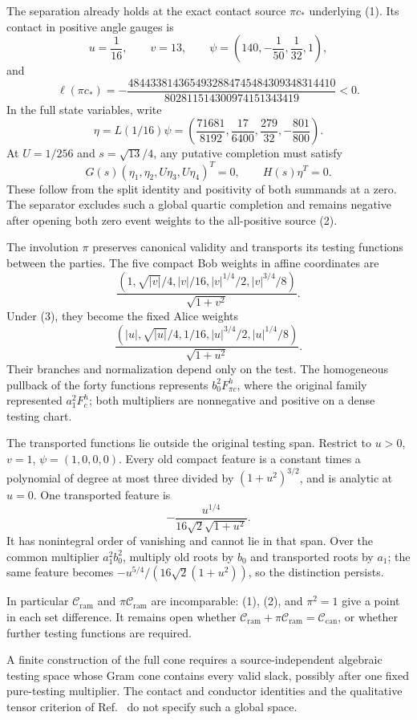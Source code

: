 \documentclass[10pt]{article}
\newcommand{\Cr}{\mathcal C_{\mathrm{ram}}}
\newcommand{\Cc}{\mathcal C_{\mathrm{can}}}
\begin{document}
The separation already holds at the exact contact source $\pi c_*$
underlying (1). Its contact in positive angle gauges is
\[
 u=\frac1{16},\qquad v=13,\qquad
 \psi=\left(140,-\frac1{50},\frac1{32},1\right),
\]
and
\[
 \ell(\pi c_*)=
 -\frac{4844338143654932884745484309348314410}
        {802811514300974151343419}<0.                    \tag{12}
\]
In the full state variables, write
\[
 \eta=L(1/16)\psi=
 \left(\frac{71681}{8192},\frac{17}{6400},
       \frac{279}{32},-\frac{801}{800}\right).
\]
At $U=1/256$ and $s=\sqrt{13}/4$, any putative completion must satisfy
\[
 G(s)(\eta_1,\eta_2,U\eta_3,U\eta_4)^T=0,\qquad
 H(s)\eta^T=0.                                          \tag{13}
\]
These follow from the split identity and positivity of both
summands at a zero. The separator excludes such a global quartic
completion and remains negative after opening both zero event weights to
the all-positive source (2).

The involution $\pi$ preserves canonical validity and transports its
testing functions between the parties. The five compact Bob weights in
affine coordinates are
\[
 \frac{(1,\sqrt{|v|}/4,|v|/16,|v|^{1/4}/2,|v|^{3/4}/8)}
      {\sqrt{1+v^2}}.
\]
Under (3), they become the fixed Alice weights
\[
 \boxed{
 \frac{(|u|,\sqrt{|u|}/4,1/16,|u|^{3/4}/2,|u|^{1/4}/8)}
      {\sqrt{1+u^2}}.}                                  \tag{14}
\]
Their branches and normalization depend only on the test. The homogeneous
pullback of the forty functions represents $b_0^2F^h_{\pi c}$,
where the original family represented $a_1^2F^h_c$; both multipliers are
nonnegative and positive on a dense testing chart.

The transported functions lie outside the original testing span. Restrict to
$u>0$, $v=1$, $\psi=(1,0,0,0)$. Every old compact feature is a constant
times a polynomial of degree at most three divided by $(1+u^2)^{3/2}$,
and is analytic at $u=0$. One transported feature is
\[
 -\frac{u^{1/4}}{16\sqrt2\sqrt{1+u^2}}.
\]
It has nonintegral order of vanishing and cannot lie in that span.
Over the common multiplier $a_1^2b_0^2$, multiply old roots by $b_0$ and
transported roots by $a_1$; the same feature becomes
$-u^{5/4}/(16\sqrt2(1+u^2))$, so the distinction persists.

In particular $\Cr$ and $\pi\Cr$ are incomparable: (1), (2), and
$\pi^2=1$ give a point in each set difference. It remains open whether
$\Cr+\pi\Cr=\Cc$, or whether further testing functions are required.

A finite construction of the full cone requires a source-independent
algebraic testing space whose Gram cone contains every valid slack,
possibly after one fixed pure-testing multiplier. The contact and
conductor identities and the qualitative tensor criterion of
Ref.~\cite{companion} do not specify such a global space.
\end{document}
